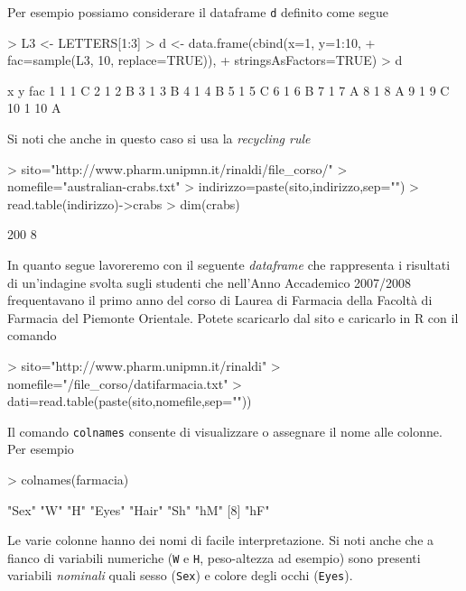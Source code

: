 \documentclass[onecolumn,11pt]{book}
\begin{document}
Per esempio possiamo considerare il dataframe \texttt{d} definito come segue%
\begin{Schunk}
\begin{Sinput}
> L3 <- LETTERS[1:3]
> d <- data.frame(cbind(x=1, y=1:10,
+ fac=sample(L3, 10, replace=TRUE)),
+ stringsAsFactors=TRUE)
> d
\end{Sinput}
\begin{Soutput}
   x  y fac
1  1  1   C
2  1  2   B
3  1  3   B
4  1  4   B
5  1  5   C
6  1  6   B
7  1  7   A
8  1  8   A
9  1  9   C
10 1 10   A
\end{Soutput}
\end{Schunk}
Si noti che anche in questo caso si usa la \emph{recycling rule}
\begin{Schunk}
\begin{Sinput}
> sito="http://www.pharm.unipmn.it/rinaldi/file_corso/"
> nomefile="australian-crabs.txt"
> indirizzo=paste(sito,indirizzo,sep="")
> read.table(indirizzo)->crabs
> dim(crabs)
\end{Sinput}
\end{Schunk}
\begin{Schunk}
\begin{Soutput}
[1] 200   8
\end{Soutput}
\end{Schunk}
In quanto segue lavoreremo con il seguente \emph{dataframe} che rappresenta i risultati di un'indagine svolta sugli studenti che nell'Anno Accademico 2007/2008 frequentavano il primo anno del corso di Laurea di Farmacia della Facolt\`a di Farmacia del Piemonte Orientale. Potete scaricarlo dal sito e caricarlo in {\textsf R} con il comando
\begin{Schunk}
\begin{Sinput}
> sito="http://www.pharm.unipmn.it/rinaldi"
> nomefile="/file_corso/datifarmacia.txt"
> dati=read.table(paste(sito,nomefile,sep=""))
\end{Sinput}
\end{Schunk}
Il comando \texttt{colnames}  consente di  visualizzare o assegnare il nome alle colonne.
Per esempio
\begin{Schunk}
\begin{Sinput}
> colnames(farmacia)
\end{Sinput}
\begin{Soutput}
[1] "Sex"  "W"    "H"    "Eyes" "Hair" "Sh"   "hM"  
[8] "hF"  
\end{Soutput}
\end{Schunk}
Le varie colonne hanno dei nomi di facile interpretazione. Si noti anche che a fianco di variabili numeriche (\texttt{W} e \texttt{H}, peso-altezza ad esempio) sono presenti variabili  \emph {nominali} quali sesso (\texttt{Sex}) e colore degli occhi (\texttt{Eyes}).  
\end{document}
